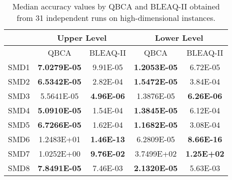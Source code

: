\documentclass[conference]{IEEEtran}
\theoremstyle{definition}
\begin{document}
\begin{table}[t]
    \caption{Median accuracy values by QBCA and BLEAQ-II obtained from 31 independent runs on high-dimensional instances.}
    \label{tab:ll-comparative-vals}
    \centering
    \begin{tabular}{|c|c|c|c|c|}
\hline
& \multicolumn{2}{c|}{Upper Level} & \multicolumn{2}{c|}{Lower Level} \\ \hline
& QBCA & BLEAQ-II & QBCA & BLEAQ-II \\ \hline
SMD1 & \textbf{7.0279E-05}  &  9.91E-05 & \textbf{1.2053E-05} &          6.72E-05 \\ \hline
SMD2 & \textbf{6.5342E-05}  &  2.82E-04 & \textbf{1.5472E-05} &          3.84E-04 \\ \hline
SMD3 & 5.5641E-05    & \textbf{4.96E-06}&          1.3876E-05 & \textbf{6.26E-06} \\ \hline
SMD4 & \textbf{5.0910E-05}  &  1.54E-04 & \textbf{1.3845E-05} &          6.12E-04 \\ \hline
SMD5 & \textbf{6.7266E-05}  &  1.62E-04 & \textbf{1.1682E-05} &          3.08E-04 \\ \hline
SMD6 & 1.2483E+01  &  \textbf{1.46E-13} &          6.2809E-05 & \textbf{8.66E-16} \\ \hline
SMD7 & 1.0252E+00  &  \textbf{9.76E-02} &          3.7499E+02 & \textbf{1.25E+02} \\ \hline
SMD8 & \textbf{7.8491E-05}  &           7.46E-03 & \textbf{2.1320E-05} &          5.63E-03 \\ \hline

    \end{tabular}
\end{table}
\end{document}
